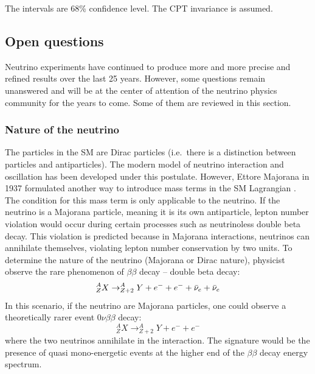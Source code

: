 \documentclass[../main.tex]{subfiles}
\begin{document}
The intervals are 68\% confidence level. The CPT invariance is assumed.

\subsection{Open questions}
\label{sec:neutrino:questions}

Neutrino experiments have continued to produce more and more precise and refined results over the last 25 years. However, some questions remain unanswered and will be at the center of attention of the neutrino physics community for the years to come. Some of them are reviewed in this section.

%
%
%
%
%

\subsubsection{Nature of the neutrino}

The particles in the SM are Dirac particles (i.e.\ there is a distinction between particles and antiparticles). The modern model of neutrino interaction and oscillation has been developed under this postulate. However, Ettore Majorana in 1937 formulated another way to introduce mass terms in the SM Lagrangian \cite{majorana_teoria_1937}. The condition for this mass term is only applicable to the neutrino. If the neutrino is a Majorana particle, meaning it is its own antiparticle, lepton number violation would occur during certain processes such as neutrinoless double beta decay. This violation is predicted because in Majorana interactions, neutrinos can annihilate themselves, violating lepton number conservation by two units. To determine the nature of the neutrino (Majorana or Dirac nature), physicist observe the rare phenomenon of $\beta\beta$ decay -- double beta decay:
\begin{equation}
  ^{A}_{Z}X \rightarrow ^{A}_{Z+2}Y + e^- + e^- + \bar{\nu}_{e} + \bar{\nu}_{e}
\end{equation}
In this scenario, if the neutrino are Majorana particles, one could observe a theoretically rarer event $0\nu\beta\beta$ decay:
\begin{equation}
  ^{A}_{Z}X \rightarrow ^{A}_{Z+2}Y + e^- + e^-
\end{equation}
where the two neutrinos annihilate in the interaction. The signature would be the presence of quasi mono-energetic events at the higher end of the $\beta\beta$ decay energy spectrum.
\end{document}
